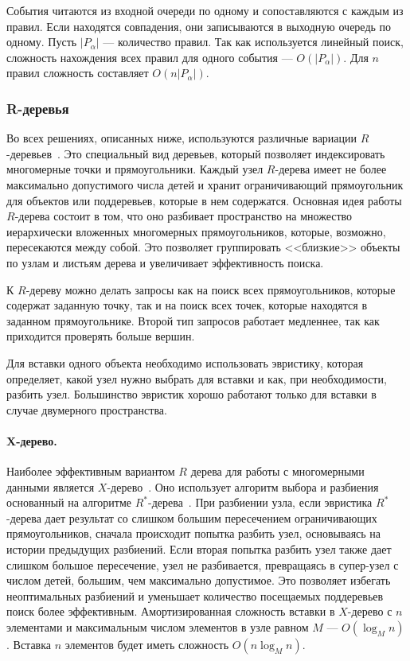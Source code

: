 \documentclass[14pt]{article}
\begin{document}
События читаются из входной очереди по одному и сопоставляются с каждым из правил. Если находятся совпадения, они записываются в выходную очередь по одному. Пусть $|P_\alpha|$ --- количество правил. Так как используется линейный поиск, сложность нахождения всех правил для одного события --- $O(|P_\alpha|)$. Для $n$ правил сложность составляет $O(n|P_\alpha|)$.

\subsubsection{R-деревья}
Во всех решениях, описанных ниже, используются различные вариации $R$-деревьев~\cite{r-tree}. Это специальный вид деревьев, который позволяет индексировать многомерные точки и прямоугольники. Каждый узел $R$-дерева имеет не более максимально допустимого числа детей и хранит ограничивающий прямоугольник для объектов или поддеревьев, которые в нем содержатся. Основная идея работы $R$-дерева состоит в том, что оно разбивает пространство на множество иерархически вложенных многомерных прямоугольников, которые, возможно, пересекаются между собой. Это позволяет группировать <<близкие>> объекты по узлам и листьям дерева и увеличивает эффективность поиска. 

К $R$-дереву можно делать запросы как на поиск всех прямоугольников, которые содержат заданную точку, так и на поиск всех точек, которые находятся в заданном прямоугольнике. Второй тип запросов работает медленнее, так как приходится проверять больше вершин.

Для вставки одного объекта необходимо использовать эвристику, которая определяет, какой узел нужно выбрать для вставки и как, при необходимости, разбить узел. Большинство эвристик хорошо работают только для вставки в случае двумерного пространства. 

\paragraph{X-дерево.} Наиболее эффективным вариантом $R$ дерева для работы с многомерными данными является $X$-дерево~\cite{x-tree}. Оно использует алгоритм выбора и разбиения основанный на алгоритме $R^*$-дерева~\cite{r-star-tree}. При разбиении узла, если эвристика $R^*$-дерева дает результат со слишком большим пересечением ограничивающих прямоугольников, сначала происходит попытка разбить узел, основываясь на истории предыдущих разбиений. Если вторая попытка разбить узел также дает слишком большое пересечение, узел не разбивается, превращаясь в супер-узел с числом детей, большим, чем максимально допустимое. Это позволяет избегать неоптимальных разбиений и уменьшает количество посещаемых поддеревьев поиск более эффективным. Амортизированная сложность вставки в $X$-дерево с $n$ элементами и максимальным числом элементов в узле равном $M$ --- $O(\log_M n)$. Вставка $n$ элементов будет иметь сложность $O(n\log_M n)$.
\end{document}
